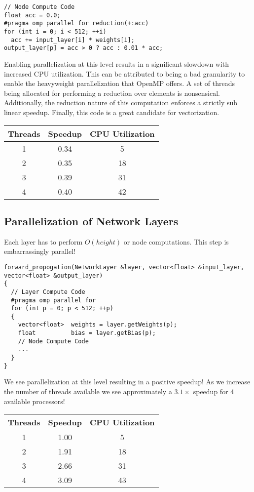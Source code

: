 \begin{lstlisting}
// Node Compute Code
float acc = 0.0;
#pragma omp parallel for reduction(+:acc)
for (int i = 0; i < 512; ++i)
  acc += input_layer[i] * weights[i];
output_layer[p] = acc > 0 ? acc : 0.01 * acc;
\end{lstlisting}

Enabling parallelization at this level results in a significant slowdown with increased CPU utilization.
This can be attributed to being a bad granularity to enable the heavyweight parallelization that OpenMP offers.
A set of threads being allocated for performing a reduction over \netheight elements is nonsensical.
Additionally, the reduction nature of this computation enforces a strictly sub linear speedup.
Finally, this code is a great candidate for vectorization.

\begin{center}
\begin{tabular}{|c|c|c|}
  \hline
  Threads & Speedup & CPU Utilization \\ \hline
  1 & 0.34 & 5 \\
  2 & 0.35 & 18 \\
  3 & 0.39 & 31 \\
  4 & 0.40 & 42 \\
  \hline
\end{tabular}
\end{center}


\subsection*{Parallelization of Network Layers}
Each layer has to perform $O(height)$ or \netheight node computations.
This step is embarrassingly parallel!

\begin{lstlisting}
forward_propogation(NetworkLayer &layer, vector<float> &input_layer, vector<float> &output_layer)
{
  // Layer Compute Code
  #pragma omp parallel for
  for (int p = 0; p < 512; ++p)
  {
    vector<float>  weights = layer.getWeights(p);
    float          bias = layer.getBias(p);
    // Node Compute Code
    ...
  }
}
\end{lstlisting}

We see parallelization at this level resulting in a positive speedup!
As we increase the number of threads available we see approximately a $3.1 \times$ speedup for 4 available processors!

\begin{center}
\begin{tabular}{|c|c|c|}
  \hline
  Threads & Speedup & CPU Utilization \\ \hline
  1 & 1.00 & 5 \\
  2 & 1.91 & 18 \\
  3 & 2.66 & 31 \\
  4 & 3.09 & 43 \\
  \hline
\end{tabular}
\end{center}

